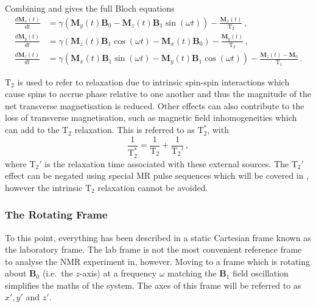 Combining  and  gives the full Bloch equations
\begin{align}
	\frac{d\mathbf{M}_x(t)}{dt} &= \gamma\left(\mathbf{M}_y(t)\mathbf{B}_0 - \mathbf{M}_z(t)\mathbf{B}_1\sin(\omega t)\right) - \frac{\mathbf{M}_x(t)}{\mathrm{T}_2}\,,\label{eq:bloch_labx}\\
	\frac{d\mathbf{M}_y(t)}{dt} &= \gamma\left(\mathbf{M}_z(t)\mathbf{B}_1\cos(\omega t) - \mathbf{M}_x(t)\mathbf{B}_0\right) - \frac{\mathbf{M}_y(t)}{\mathrm{T}_2}\,,\label{eq:bloch_laby}\\
	\frac{d\mathbf{M}_z(t)}{dt} &= \gamma \left(\mathbf{M}_x(t)\mathbf{B}_1\sin(\omega t) - \mathbf{M}_y(t)\mathbf{B}_1\cos(\omega t) \right) - \frac{\mathbf{M}_z(t) - \mathbf{M}_0}{\mathrm{T}_1}\,. \label{eq:bloch_labz}
\end{align}

$\mathrm{T}_2$ is used to refer to relaxation due to intrinsic spin-spin interactions which cause spins to accrue phase relative to one another and thus the magnitude of the net transverse magnetisation is reduced.
Other effects can also contribute to the loss of transverse magnetisation, such as magnetic field inhomogeneities which can add to the $\mathrm{T}_2$ relaxation.
This is referred to as $\mathrm{T}_2^*$, with
\begin{equation}
  \frac{1}{\mathrm{T}_2^*} = \frac{1}{\mathrm{T}_2} + \frac{1}{\mathrm{T}_2'}\,,
  \label{eq:t2star}
\end{equation}
where $\mathrm{T}_2'$ is the relaxation time associated with these external sources. The $\mathrm{T}_2'$ effect can be negated using special MR pulse sequences which will be covered in , however the intrinsic $\mathrm{T}_2$ relaxation cannot be avoided.  


\subsubsection{The Rotating Frame}
To this point, everything has been described in a static Cartesian frame known as the laboratory frame. 
The lab frame is not the most convenient reference frame to analyse the \ac{NMR} experiment in, however.
Moving to a frame which is rotating about $\mathbf{B}_0$ (i.e.\ the $z$-axis) at a frequency $\omega$ matching the $\mathbf{B}_1$ field oscillation simplifies the maths of the system. 
The axes of this frame will be referred to as $x', y'$ and $z'$. 

